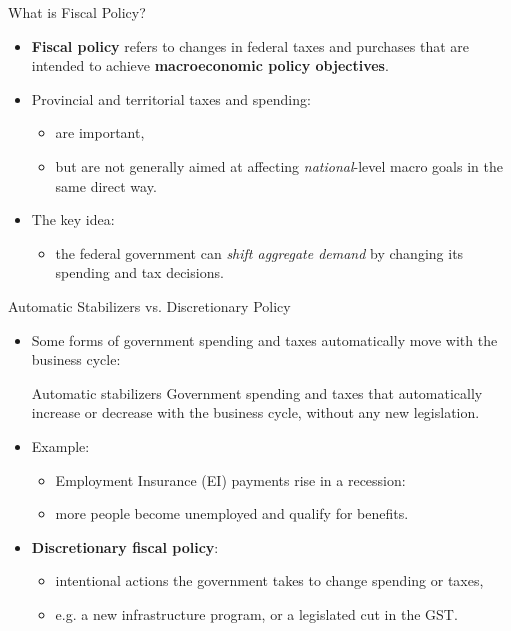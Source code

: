 \documentclass[aspectratio=169]{beamer}
\begin{document}
\begin{frame}{What is Fiscal Policy?}
\transfade
\begin{itemize}
  \item \textbf{Fiscal policy} refers to changes in \alert{federal taxes and purchases}
        that are intended to achieve \textbf{macroeconomic policy objectives}.
  \item Provincial and territorial taxes and spending:
  \begin{itemize}
    \item are important,
    \item but are not generally aimed at affecting \emph{national}-level macro goals in the same direct way.
  \end{itemize}
  \item The key idea:
  \begin{itemize}
    \item the federal government can \emph{shift aggregate demand} by changing its spending and tax decisions.
  \end{itemize}
\end{itemize}
\end{frame}

\begin{frame}{Automatic Stabilizers vs. Discretionary Policy}
\transfade
\begin{itemize}
  \item Some forms of government spending and taxes automatically move with the business cycle:
  \begin{block}{Automatic stabilizers}
    Government spending and taxes that \alert{automatically increase or decrease}
    with the business cycle, without any new legislation.
  \end{block}
  \item Example:
  \begin{itemize}
    \item Employment Insurance (EI) payments rise in a recession:
    \item more people become unemployed and qualify for benefits.
  \end{itemize}
  \item \textbf{Discretionary fiscal policy}:
  \begin{itemize}
    \item intentional actions the government takes to change spending or taxes,
    \item e.g. a new infrastructure program, or a legislated cut in the GST.
  \end{itemize}
\end{itemize}
\end{frame}
\end{document}
